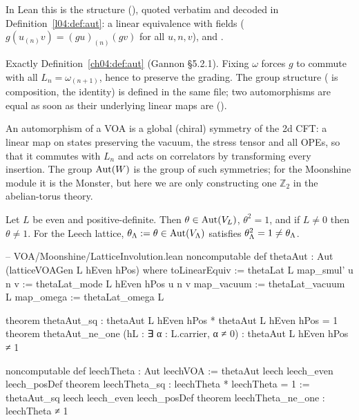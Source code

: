 In Lean this is the structure  (), quoted
verbatim and decoded in Definition~\ref{l04:def:aut}: a linear equivalence 
with fields  ($g(u_{(n)}v)=(gu)_{(n)}(gv)$ for all $u,n,v$), 
and .

\begin{dictionary}
Exactly Definition~\ref{ch04:def:aut} (Gannon \S5.2.1). Fixing $\omega$ forces $g$ to commute with
all $L_n=\omega_{(n+1)}$, hence to preserve the grading. The group structure (\lean{*} is
composition,  the identity) is defined in the same file; two automorphisms are equal as
soon as their underlying linear maps are ().
\end{dictionary}

\begin{physics}
An automorphism of a VOA is a global (chiral) symmetry of the 2d CFT: a linear map on states preserving the vacuum, the stress tensor and all OPEs, so that it commutes with $L_n$ and acts on correlators by transforming every insertion. The group $\operatorname{Aut}(W)$ is the group of such symmetries; for the Moonshine module it is the Monster, but here we are only constructing one $\mathbb Z_2$ in the abelian-torus theory.
\end{physics}

\begin{theorem}\label{ch04:thm:thetaAut}
Let $L$ be even and positive-definite. Then $\theta\in\operatorname{Aut}(V_L)$, $\theta^2=1$, and if $L\neq0$
then $\theta\neq1$. For the Leech lattice, $\theta_{\Lambda}:=\theta\in\operatorname{Aut}(V_{\Lambda})$ satisfies
$\theta_{\Lambda}^2=1\neq\theta_{\Lambda}$.
\end{theorem}

\begin{leancode}
-- VOA/Moonshine/LatticeInvolution.lean
noncomputable def thetaAut : Aut (latticeVOAGen L hEven hPos) where
  toLinearEquiv := thetaLat L
  map_smul' u n v := thetaLat_mode L hEven hPos u n v
  map_vacuum := thetaLat_vacuum L
  map_omega := thetaLat_omega L

theorem thetaAut_sq : thetaAut L hEven hPos * thetaAut L hEven hPos = 1
theorem thetaAut_ne_one (hL : ∃ α : L.carrier, α ≠ 0) : thetaAut L hEven hPos ≠ 1

noncomputable def leechTheta : Aut leechVOA := thetaAut leech leech_even leech_posDef
theorem leechTheta_sq : leechTheta * leechTheta = 1 := thetaAut_sq leech leech_even leech_posDef
theorem leechTheta_ne_one : leechTheta ≠ 1
\end{leancode}

